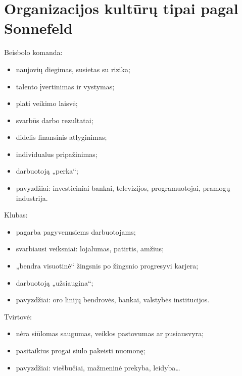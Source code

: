 
\section{Organizacijos kultūrų tipai pagal Sonnefeld}

Beisbolo komanda:
\begin{itemize}
  \item naujovių diegimas, susietas su rizika;
  \item talento įvertinimas ir vystymas;
  \item plati veikimo laisvė;
  \item svarbūs darbo rezultatai;
  \item didelis finansinis atlyginimas;
  \item individualus pripažinimas;
  \item darbuotoją „perka“;
  \item pavyzdžiai: investiciniai bankai, televizijos, programuotojai,
    pramogų industrija.
\end{itemize}

Klubas:
\begin{itemize}
  \item pagarba pagyvenusiems darbuotojams;
  \item svarbiausi veiksniai: lojalumas, patirtis, amžius;
  \item „bendra visuotinė“ žingsnis po žingsnio progresyvi karjera;
  \item darbuotoją „užsiaugina“;
  \item pavyzdžiai: oro linijų bendrovės, bankai, valstybės institucijos.
\end{itemize}

Tvirtovė:
\begin{itemize}
  \item nėra siūlomas saugumas, veiklos pastovumas ar pusiausvyra;
  \item pasitaikius progai siūlo pakeisti nuomonę;
  \item pavyzdžiai: viešbučiai, mažmeninė prekyba, leidyba…
\end{itemize}

